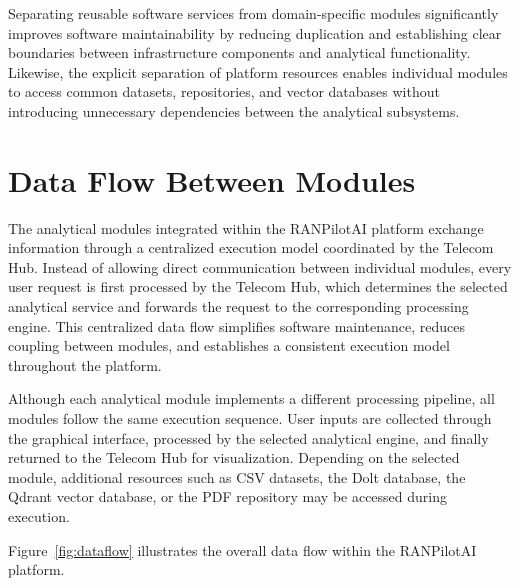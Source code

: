 Separating reusable software services from domain-specific modules significantly improves software maintainability by reducing duplication and establishing clear boundaries between infrastructure components and analytical functionality. Likewise, the explicit separation of platform resources enables individual modules to access common datasets, repositories, and vector databases without introducing unnecessary dependencies between the analytical subsystems.
\section{Data Flow Between Modules}

The analytical modules integrated within the RANPilotAI platform exchange information through a centralized execution model coordinated by the Telecom Hub. Instead of allowing direct communication between individual modules, every user request is first processed by the Telecom Hub, which determines the selected analytical service and forwards the request to the corresponding processing engine. This centralized data flow simplifies software maintenance, reduces coupling between modules, and establishes a consistent execution model throughout the platform.

Although each analytical module implements a different processing pipeline, all modules follow the same execution sequence. User inputs are collected through the graphical interface, processed by the selected analytical engine, and finally returned to the Telecom Hub for visualization. Depending on the selected module, additional resources such as CSV datasets, the Dolt database, the Qdrant vector database, or the PDF repository may be accessed during execution.

Figure~\ref{fig:dataflow} illustrates the overall data flow within the RANPilotAI platform.


